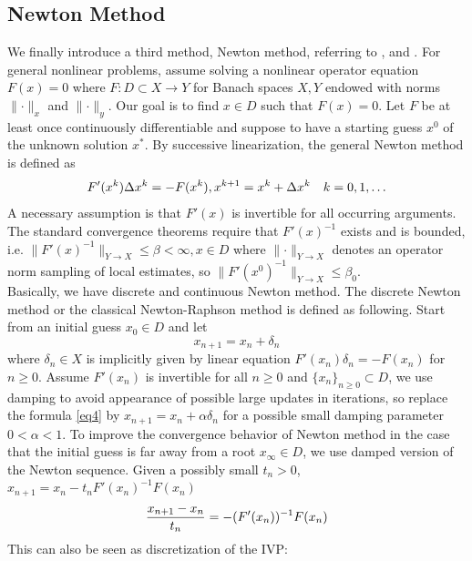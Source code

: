 \documentclass[
11pt, %
a4paper, %
oneside, %
headinclude,footinclude, %
BCOR5mm, %
]{scrartcl}
\begin{document}
\subsection{Newton Method}
We finally introduce a third method, Newton method, referring to \cite{alexander1991modified}, \cite{deuflhard2005newton} and \cite{amrein2014adaptive}. For general nonlinear problems, assume solving a nonlinear operator equation $F(x)=0$ where $F: D\subset X\rightarrow Y$ for Banach spaces $X,Y$ endowed with norms $\parallel \cdot \parallel_x$ and $\parallel \cdot \parallel_y$. Our goal is to find $x\in D$ such that $F(x)=0$. Let $F$ be at least once continuously differentiable and suppose to have a starting guess $x^0$ of the unknown solution $x^*$. By successive linearization, the general Newton method is defined as 
\begin{equation}
    F'(x^k)\Delta x^k=-F(x^k), x^{k+1}=x^k+\Delta x^k \quad k=0,1,\dots \notag
\end{equation}
A necessary assumption is that $F'(x)$ is invertible for all occurring arguments. The standard convergence theorems require that $F'(x)^{-1}$ exists and is bounded, i.e. $\parallel F'(x)^{-1} \parallel_{Y\rightarrow X}\leq \beta <\infty, x\in D$ where $\parallel \cdot \parallel_{Y\rightarrow X}$ denotes an operator norm sampling of local estimates, so $\parallel F'(x^0)^{-1} \parallel_{Y\rightarrow X}\leq \beta_0$.
\vspace{0.6em}\\Basically, we have discrete and continuous Newton method. The discrete Newton method or the classical Newton-Raphson method is defined as following. Start from an initial guess $x_0\in D$ and let 
\begin{equation}
\label{eq4}
    x_{n+1}=x_n+\delta_n \tag{2.5}
\end{equation}
where $\delta_n\in X$ is implicitly given by linear equation $F'(x_n)\delta_n=-F(x_n)$ for $n\geq 0$. Assume $F'(x_n)$ is invertible for all $n\geq 0$ and $\{x_n\}_{n\geq 0}\subset D$, we use damping to avoid appearance of possible large updates in iterations, so replace the formula \vref{eq4} by $x_{n+1}=x_n+\alpha \delta_n$ for a possible small damping parameter $0<\alpha<1$. To improve the convergence behavior of Newton method in the case that the initial guess is far away from a root $x_\infty\in D$, we use damped version of the Newton sequence. Given a possibly small $t_n>0$, $x_{n+1}=x_n-t_nF'(x_n)^{-1}F(x_n)$
\begin{equation}
    \frac{x_{n+1}-x_n}{t_n}=-(F'(x_n))^{-1}F(x_n) \notag
\end{equation}
This can also be seen as discretization of the IVP: 
\end{document}
